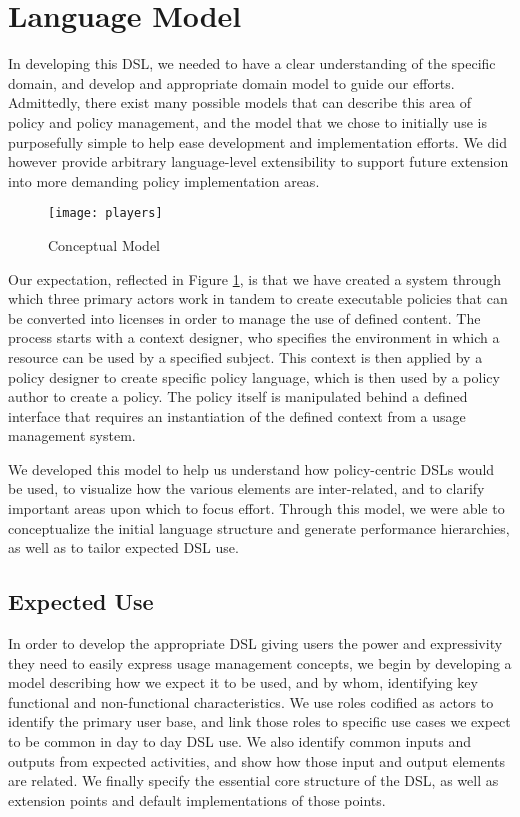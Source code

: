 \section{Language Model}\label{sec:model}
In developing this DSL, we needed to have a clear understanding of the specific domain, and develop and appropriate domain model to guide our efforts.  Admittedly, there exist many possible models that can describe this area of policy and policy management, and the model that we chose to initially use is purposefully simple to help ease development and implementation efforts.  We did however provide arbitrary language-level extensibility to support future extension into more demanding policy implementation areas.

\begin{figure}[!t]
\centering
\texttt{[image: players]}
\caption{Conceptual Model}
\label{fig:model:conceptual-model}
\end{figure}

Our expectation, reflected in Figure \ref{fig:model:conceptual-model}, is that we have created a system through which three primary actors work in tandem to create executable policies that can be converted into licenses in order to manage the use of defined content.  The process starts with a context designer, who specifies the environment in which a resource can be used by a specified subject.  This context is then applied by a policy designer to create specific policy language, which is then used by a policy author to create a policy.  The policy itself is manipulated behind a defined interface that requires an instantiation of the defined context from a usage management system.

We developed this model to help us understand how policy-centric DSLs would be used, to visualize how the various elements are inter-related, and to clarify important areas upon which to focus effort.  Through this model, we were able to conceptualize the initial language structure and generate performance hierarchies, as well as to tailor expected DSL use.

\subsection{Expected Use}
In order to develop the appropriate DSL giving users the power and expressivity they need to easily express usage management concepts, we begin by developing a model describing how we expect it to be used, and by whom, identifying key functional and non-functional characteristics.  We use roles codified as actors to identify the primary user base, and link those roles to specific use cases we expect to be common in day to day DSL use.  We also identify common inputs and outputs from expected activities, and show how those input and output elements are related.  We finally specify the essential core structure of the DSL, as well as extension points and default implementations of those points.

